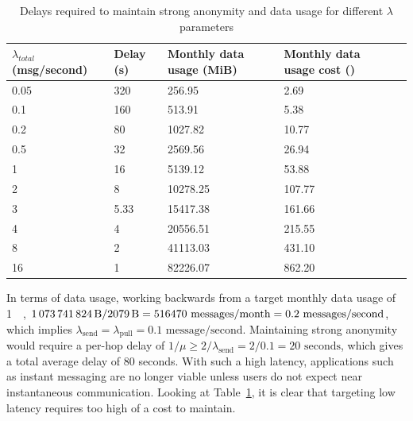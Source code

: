 \documentclass[final,dissertation.tex]{subfiles}
\begin{document}
\begin{table}[]
	\centering
	\begin{tabular}{@{}lllll@{}}
		\toprule
		$\lambda_{total}$ (msg/second) & Delay (s) & Monthly data usage (MiB) & Monthly data usage cost (\textsterling) &  \\ \midrule
		0.05              & 320       & 256.95                   & 2.69                      &  \\
		0.1               & 160       & 513.91                   & 5.38                      &  \\
		0.2               & 80        & 1027.82                  & 10.77                     &  \\
		0.5               & 32        & 2569.56                  & 26.94                     &  \\
		1                 & 16        & 5139.12                  & 53.88                     &  \\
		2                 & 8         & 10278.25                 & 107.77                    &  \\
		3                 & 5.33      & 15417.38                 & 161.66                    &  \\
		4                 & 4         & 20556.51                 & 215.55                    &  \\
		8                 & 2         & 41113.03                 & 431.10                    &  \\
		16                & 1         & 82226.07                 & 862.20                    &  \\ \bottomrule
	\end{tabular}
	\caption{Delays required to maintain strong anonymity and data usage for different $\lambda$ parameters}
	\label{table:tuning}
\end{table}

In terms of data usage, working backwards from a target monthly data usage of \SI{1}{\gibi\byte}, $\SI{1073741824}{\byte}/\SI{2079}{\byte} = 516470 \text{ messages}/\text{month} = 0.2\text{ messages}/\text{second}$, which implies $\lambda_\text{send} = \lambda_\text{pull} = 0.1 \text{ message/second}$. Maintaining strong anonymity would require a per-hop delay of $1/\mu \ge 2/\lambda_\text{send} = 2/0.1 = 20 \text{ seconds}$, which gives a total average delay of 80 seconds. With such a high latency, applications such as instant messaging are no longer viable unless users do not expect near instantaneous communication. Looking at Table~\ref{table:tuning}, it is clear that targeting low latency requires too high of a cost to maintain.
\end{document}
